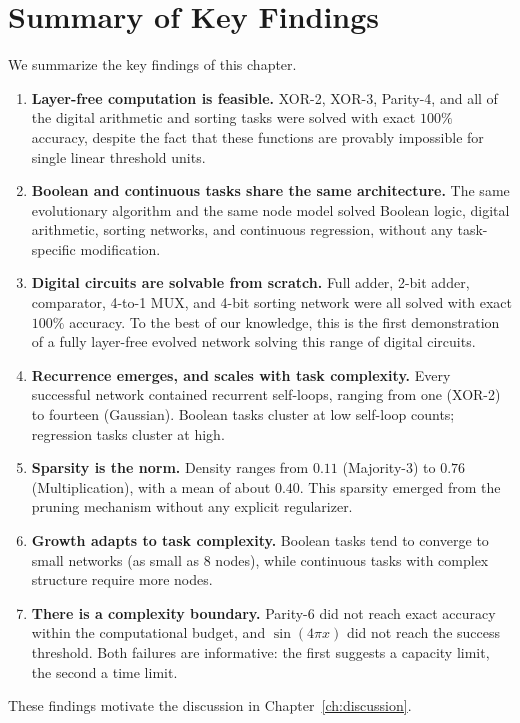 \section{Summary of Key Findings}
\label{sec:results-summary}

We summarize the key findings of this chapter.

\begin{enumerate}
  \item \textbf{Layer-free computation is feasible.} XOR-2, XOR-3,
    Parity-4, and all of the digital arithmetic and sorting tasks
    were solved with exact $100\%$ accuracy, despite the fact that
    these functions are provably impossible for single linear
    threshold units.

  \item \textbf{Boolean and continuous tasks share the same
    architecture.} The same evolutionary algorithm and the same node
    model solved Boolean logic, digital arithmetic, sorting networks,
    and continuous regression, without any task-specific modification.

  \item \textbf{Digital circuits are solvable from scratch.} Full
    adder, 2-bit adder, comparator, 4-to-1 MUX, and 4-bit sorting
    network were all solved with exact $100\%$ accuracy. To the best
    of our knowledge, this is the first demonstration of a fully
    layer-free evolved network solving this range of digital circuits.

  \item \textbf{Recurrence emerges, and scales with task complexity.}
    Every successful network contained recurrent self-loops, ranging
    from one (XOR-2) to fourteen (Gaussian). Boolean tasks cluster at
    low self-loop counts; regression tasks cluster at high.

  \item \textbf{Sparsity is the norm.} Density ranges from $0.11$
    (Majority-3) to $0.76$ (Multiplication), with a mean of about
    $0.40$. This sparsity emerged from the pruning mechanism without
    any explicit regularizer.

  \item \textbf{Growth adapts to task complexity.} Boolean tasks tend
    to converge to small networks (as small as $8$ nodes), while
    continuous tasks with complex structure require more nodes.

  \item \textbf{There is a complexity boundary.} Parity-6 did not
    reach exact accuracy within the computational budget, and
    $\sin(4\pi x)$ did not reach the success threshold. Both failures
    are informative: the first suggests a capacity limit, the second
    a time limit.
\end{enumerate}

These findings motivate the discussion in Chapter~\ref{ch:discussion}.


